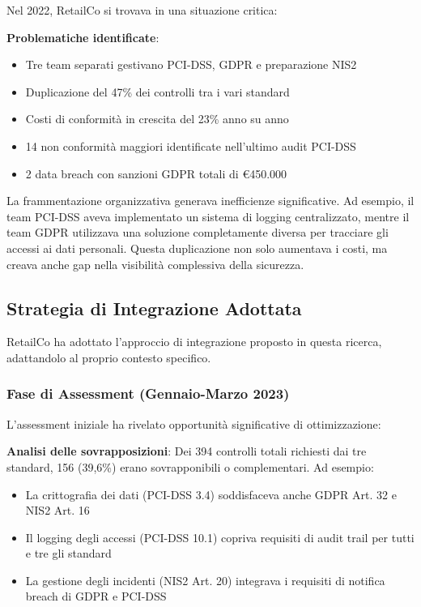 Nel 2022, RetailCo si trovava in una situazione critica:

\textbf{Problematiche identificate}:
\begin{itemize}
    \item Tre team separati gestivano PCI-DSS, GDPR e preparazione NIS2
    \item Duplicazione del 47\% dei controlli tra i vari standard
    \item Costi di conformità in crescita del 23\% anno su anno
    \item 14 non conformità maggiori identificate nell'ultimo audit PCI-DSS
    \item 2 data breach con sanzioni GDPR totali di €450.000
\end{itemize}

La frammentazione organizzativa generava inefficienze significative. Ad esempio, il team PCI-DSS aveva implementato un sistema di logging centralizzato, mentre il team GDPR utilizzava una soluzione completamente diversa per tracciare gli accessi ai dati personali. Questa duplicazione non solo aumentava i costi, ma creava anche gap nella visibilità complessiva della sicurezza.

\subsection{\texorpdfstring{Strategia di Integrazione Adottata}{4.7.2 - Strategia di Integrazione Adottata}}
\label{subsec:4.7.2_strategia}

RetailCo ha adottato l'approccio di integrazione proposto in questa ricerca, adattandolo al proprio contesto specifico.

\subsubsection{\texorpdfstring{Fase di Assessment (Gennaio-Marzo 2023)}{4.7.2.1 - Fase di Assessment (Gennaio-Marzo 2023)}}

L'assessment iniziale ha rivelato opportunità significative di ottimizzazione:

\textbf{Analisi delle sovrapposizioni}: Dei 394 controlli totali richiesti dai tre standard, 156 (39,6\%) erano sovrapponibili o complementari. Ad esempio:
\begin{itemize}
    \item La crittografia dei dati (PCI-DSS 3.4) soddisfaceva anche GDPR Art. 32 e NIS2 Art. 16
    \item Il logging degli accessi (PCI-DSS 10.1) copriva requisiti di audit trail per tutti e tre gli standard
    \item La gestione degli incidenti (NIS2 Art. 20) integrava i requisiti di notifica breach di GDPR e PCI-DSS
\end{itemize}

